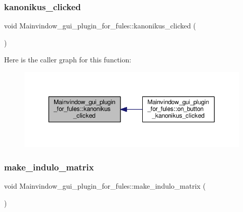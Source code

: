 \subsubsection{\texorpdfstring{kanonikus\+\_\+clicked}{kanonikus\_clicked}}
{\footnotesize\ttfamily void Mainvindow\+\_\+gui\+\_\+plugin\+\_\+for\+\_\+fules\+::kanonikus\+\_\+clicked (\begin{DoxyParamCaption}{ }\end{DoxyParamCaption})\hspace{0.3cm}{\ttfamily [signal]}}

Here is the caller graph for this function\+:\nopagebreak
\begin{figure}[H]
\begin{center}
\leavevmode
\includegraphics[width=350pt]{classMainvindow__gui__plugin__for__fules_a4ca08e417e9b4784db455ed9016870cc_icgraph}
\end{center}
\end{figure}
\mbox{\label{classMainvindow__gui__plugin__for__fules_a69be0da66c49005cb7178c140b53dccb}} 
\subsubsection{\texorpdfstring{make\+\_\+indulo\+\_\+matrix}{make\_indulo\_matrix}}
{\footnotesize\ttfamily void Mainvindow\+\_\+gui\+\_\+plugin\+\_\+for\+\_\+fules\+::make\+\_\+indulo\+\_\+matrix (\begin{DoxyParamCaption}{ }\end{DoxyParamCaption})\hspace{0.3cm}{\ttfamily [signal]}}

